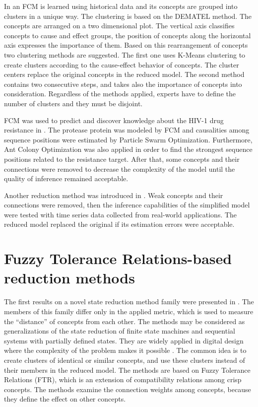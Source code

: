 \documentclass[graybox]{svmult}
\begin{document}
In \cite{alizadeh2008using} an FCM is learned using historical data and its concepts are grouped into clusters in a unique way. The clustering is based on the DEMATEL \cite{dematel} method. The concepts are arranged on a two dimensional plot. The vertical axis classifies concepts to cause and effect groups, the position of concepts along the horizontal axis expresses the importance of them. Based on this rearrangement of concepts two clustering methods are suggested. The first one uses K-Means clustering to create clusters according to the cause-effect behavior of concepts. The cluster centers replace the original concepts in the reduced model. The second method contains two consecutive steps, and takes also the importance of concepts into consideration. Regardless of the methods applied, experts have to define the number of clusters and they must be disjoint.

FCM was used to predict and discover knowledge about the HIV-1 drug resistance in \cite{NapolesHIV}. The protease protein was modeled by FCM and causalities among sequence positions were estimated by Particle Swarm Optimization. Furthermore, Ant Colony Optimization was also applied in order to find the strongest sequence positions related to the resistance target. After that, some concepts and their connections were removed to decrease the complexity of the model until the quality of inference remained acceptable.

Another reduction method was introduced in \cite{Homenda2014}. Weak concepts and their connections were removed, then the inference capabilities of the simplified model were tested with time series data collected from real-world applications. The reduced model replaced the original if its estimation errors were acceptable.

\section{Fuzzy Tolerance Relations-based reduction methods}
\label{sec:FTR}

The first results on a novel state reduction method family were presented in \cite{hatwagner2014strategic,hatwagner2015new}. The members of this family differ only in the applied metric, which is used to measure the ``distance'' of concepts from each other. The methods may be considered as generalizations of the state reduction of finite state machines and sequential systems with partially defined states. They are widely applied in digital design where the complexity of the problem makes it possible \cite{kohaviz.jhan.k.2009}. The common idea is to create clusters of identical or similar concepts, and use these clusters instead of their members in the reduced model. The methods are based on Fuzzy Tolerance Relations (FTR), which is an extension of compatibility relations among crisp concepts. The methods examine the connection weights among concepts, because they define the effect on other concepts.
\end{document}
